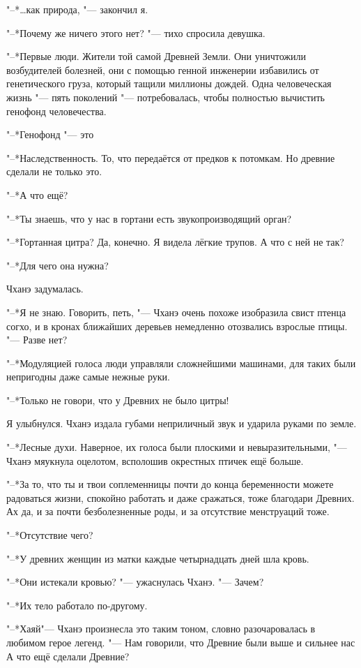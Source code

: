 \documentclass[a4paper,10pt,fleqn]{book}
\newcommand{\ldotst}{\so{...}\xspace}
\begin{document}
"--*\ldots как природа, "--- закончил я.

"--*Почему же ничего этого нет? "--- тихо спросила девушка.

"--*Первые люди.
Жители той самой Древней Земли.
Они уничтожили возбудителей болезней, они с помощью генной инженерии избавились от генетического груза, который тащили миллионы дождей.
Одна человеческая жизнь "--- пять поколений "--- потребовалась, чтобы полностью вычистить генофонд человечества.

"--*Генофонд "--- это\ldotst

"--*Наследственность.
То, что передаётся от предков к потомкам.
Но древние сделали не только это.

"--*А что ещё?

"--*Ты знаешь, что у нас в гортани есть звукопроизводящий орган?

"--*Гортанная цитра?
Да, конечно.
Я видела лёгкие трупов.
А что с ней не так?

"--*Для чего она нужна?

Чханэ задумалась.

"--*Я не знаю.
Говорить, петь, "--- Чханэ очень похоже изобразила свист птенца согхо, и в кронах ближайших деревьев немедленно отозвались взрослые птицы.
"--- Разве нет?

"--*Модуляцией голоса люди управляли сложнейшими машинами, для таких были непригодны даже самые нежные руки.

"--*Только не говори, что у Древних не было цитры!

Я улыбнулся.
Чханэ издала губами неприличный звук и ударила руками по земле.

"--*Лесные духи.
Наверное, их голоса были плоскими и невыразительными, "--- Чханэ мяукнула оцелотом, всполошив окрестных птичек ещё больше.

"--*За то, что ты и твои соплеменницы почти до конца беременности можете радоваться жизни, спокойно работать и даже сражаться, тоже благодари Древних.
Ах да, и за почти безболезненные роды, и за отсутствие менструаций тоже.

"--*Отсутствие чего?

"--*У древних женщин из матки каждые четырнадцать дней шла кровь.

"--*Они истекали кровью? "--- ужаснулась Чханэ.
"--- Зачем?

"--*Их тело работало по-другому.

"--*Хаяй\ldotst "--- Чханэ произнесла это таким тоном, словно разочаровалась в любимом герое легенд.
"--- Нам говорили, что Древние были выше и сильнее нас\ldotst
А что ещё сделали Древние?
\end{document}
